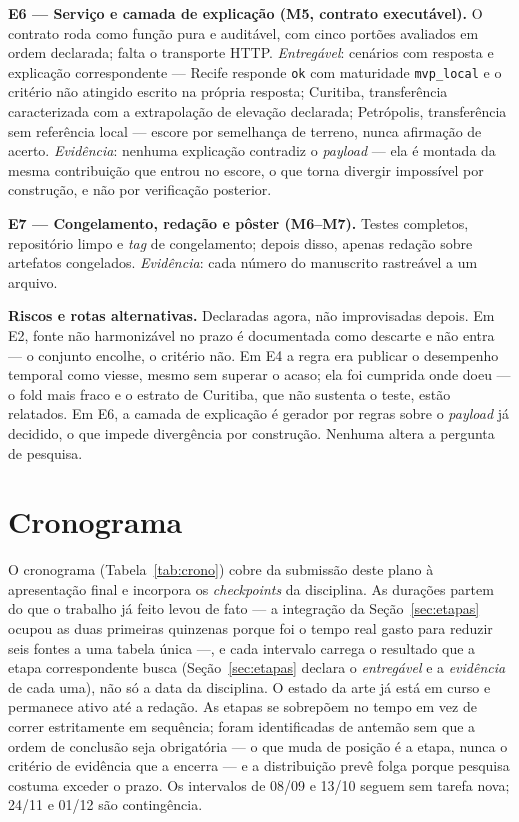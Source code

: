 \documentclass[conference]{IEEEtran}
\begin{document}
\textbf{E6 --- Serviço e camada de explicação (M5, contrato executável).} O
contrato roda como função pura e auditável, com cinco portões avaliados em ordem
declarada; falta o transporte HTTP. \emph{Entregável}: cenários com resposta e
explicação correspondente --- Recife responde \texttt{ok} com maturidade
\texttt{mvp\_local} e o critério não atingido escrito na própria resposta;
Curitiba, transferência caracterizada com a extrapolação de elevação declarada;
Petrópolis, transferência sem referência local --- escore por semelhança de
terreno, nunca afirmação de acerto.
\emph{Evidência}: nenhuma explicação contradiz o \emph{payload} --- ela é montada
da mesma contribuição que entrou no escore, o que torna divergir impossível por
construção, e não por verificação posterior.

\textbf{E7 --- Congelamento, redação e pôster (M6--M7).} Testes completos,
repositório limpo e \emph{tag} de congelamento; depois disso, apenas redação
sobre artefatos congelados. \emph{Evidência}: cada número do manuscrito
rastreável a um arquivo.

\textbf{Riscos e rotas alternativas.} Declaradas agora, não improvisadas depois.
Em E2, fonte não harmonizável no prazo é documentada como descarte e não entra ---
o conjunto encolhe, o critério não. Em E4 a regra era publicar o desempenho
temporal como viesse, mesmo sem superar o acaso; ela foi cumprida onde doeu ---
o fold mais fraco e o estrato de Curitiba, que não sustenta o teste, estão
relatados. Em E6, a camada de explicação é gerador por regras sobre o \emph{payload}
já decidido, o que impede divergência por construção. Nenhuma altera a pergunta de
pesquisa.

\section{Cronograma}
\label{sec:crono}

O cronograma (Tabela~\ref{tab:crono}) cobre da submissão deste plano à
apresentação final e incorpora os \emph{checkpoints} da disciplina. As
durações partem do que o trabalho já feito levou de fato --- a integração da
Seção~\ref{sec:etapas} ocupou as duas primeiras quinzenas porque foi o tempo
real gasto para reduzir seis fontes a uma tabela única ---, e cada intervalo
carrega o resultado que a etapa correspondente busca (Seção~\ref{sec:etapas}
declara o \emph{entregável} e a \emph{evidência} de cada uma), não só a data
da disciplina. O estado da
arte já está em curso e permanece ativo até a redação. As etapas se sobrepõem
no tempo em vez de correr estritamente em sequência; foram identificadas de
antemão sem que a ordem de conclusão seja obrigatória --- o que muda de
posição é a etapa, nunca o critério de evidência
que a encerra --- e a distribuição prevê folga porque pesquisa costuma exceder o
prazo. Os intervalos de 08/09 e 13/10 seguem sem tarefa nova; 24/11 e 01/12 são
contingência.
\end{document}
